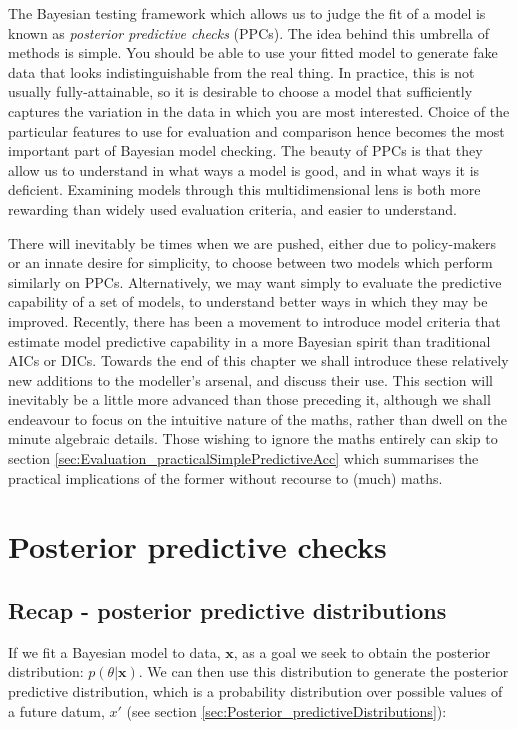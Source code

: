 \documentclass[11pt,fullpage]{book}
\begin{document}
The Bayesian testing framework which allows us to judge the fit of a model is known as \textit{posterior predictive checks} (PPCs). The idea behind this umbrella of methods is simple. You should be able to use your fitted model to generate fake data that looks indistinguishable from the real thing. In practice, this is not usually fully-attainable, so it is desirable to choose a model that sufficiently captures the variation in the data in which you are most interested. Choice of the particular features to use for evaluation and comparison hence becomes the most important part of Bayesian model checking. The beauty of PPCs is that they allow us to understand in what ways a model is good, and in what ways it is deficient. Examining models through this multidimensional lens is both more rewarding than widely used evaluation criteria, and easier to understand.

There will inevitably be times when we are pushed, either due to policy-makers or an innate desire for simplicity, to choose between two models which perform similarly on PPCs. Alternatively, we may want simply to evaluate the predictive capability of a set of models, to understand better ways in which they may be improved. Recently, there has been a movement to introduce model criteria that estimate model predictive capability in a more Bayesian spirit than traditional AICs or DICs. Towards the end of this chapter we shall introduce these relatively new additions to the modeller's arsenal, and discuss their use. This section will inevitably be a little more advanced than those preceding it, although we shall endeavour to focus on the intuitive nature of the maths, rather than dwell on the minute algebraic details. Those wishing to ignore the maths entirely can skip to section \ref{sec:Evaluation_practicalSimplePredictiveAcc} which summarises the practical implications of the former without recourse to (much) maths.

\section{Posterior predictive checks}
\subsection{Recap - posterior predictive distributions}\label{sec:Evaluation_posteriorPredDist}
If we fit a Bayesian model to data, $\boldsymbol{x}$, as a goal we seek to obtain the posterior distribution: $p(\theta|\boldsymbol{x})$. We can then use this distribution to generate the posterior predictive distribution, which is a probability distribution over possible values of a future datum, $x'$ (see section \ref{sec:Posterior_predictiveDistributions}):
\end{document}
